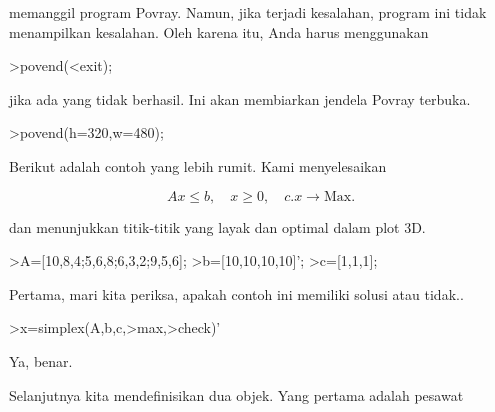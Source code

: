 \documentclass[12pt,arial,letterpaper]{book}
\begin{document}
\begin{eulercomment}
\begin{eulercomment}
\begin{eulercomment}
\begin{eulercomment}
\begin{eulercomment}
\begin{eulercomment}
\begin{eulercomment}
\begin{eulercomment}
\begin{eulercomment}
\begin{eulercomment}
\begin{eulercomment}
\begin{eulercomment}
\begin{eulercomment}
\begin{eulercomment}
\begin{eulercomment}
\begin{eulercomment}
\begin{eulercomment}
\begin{eulercomment}
\begin{eulercomment}
memanggil program Povray. Namun, jika terjadi kesalahan, program ini
tidak menampilkan kesalahan. Oleh karena itu, Anda harus menggunakan

\end{eulercomment}
\begin{eulerttcomment}
 >povend(<exit);
\end{eulerttcomment}
\begin{eulercomment}

jika ada yang tidak berhasil. Ini akan membiarkan jendela Povray
terbuka.
\end{eulercomment}
\begin{eulerprompt}
>povend(h=320,w=480);
\end{eulerprompt}
\begin{eulercomment}
Berikut adalah contoh yang lebih rumit. Kami menyelesaikan

\end{eulercomment}
\begin{eulerformula}
\[
Ax \le b, \quad x \ge 0, \quad c.x \to \text{Max.}
\]
\end{eulerformula}
\begin{eulercomment}
dan menunjukkan titik-titik yang layak dan optimal dalam plot 3D.
\end{eulercomment}
\begin{eulerprompt}
>A=[10,8,4;5,6,8;6,3,2;9,5,6];
>b=[10,10,10,10]';
>c=[1,1,1];
\end{eulerprompt}
\begin{eulercomment}
Pertama, mari kita periksa, apakah contoh ini memiliki solusi atau
tidak..
\end{eulercomment}
\begin{eulerprompt}
>x=simplex(A,b,c,>max,>check)'
\end{eulerprompt}
\begin{euleroutput}
  [0,  1,  0.5]
\end{euleroutput}
\begin{eulercomment}
Ya, benar.

Selanjutnya kita mendefinisikan dua objek. Yang pertama adalah pesawat


\end{eulercomment}
\end{eulercomment}
\end{eulercomment}
\end{eulercomment}
\end{eulercomment}
\end{eulercomment}
\end{eulercomment}
\end{eulercomment}
\end{eulercomment}
\end{eulercomment}
\end{eulercomment}
\end{eulercomment}
\end{eulercomment}
\end{eulercomment}
\end{eulercomment}
\end{eulercomment}
\end{eulercomment}
\end{eulercomment}
\end{eulercomment}
\end{document}
